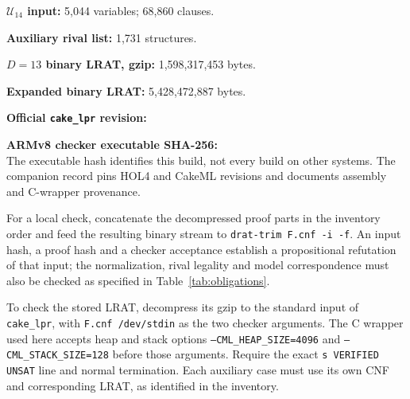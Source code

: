\documentclass[11pt,a4paper]{article}
\theoremstyle{definition}
\newcommand{\U}{\mathcal U_{14}}
\begin{document}
\medskip\noindent\textbf{$\U$ input:} 5,044 variables; 68,860 clauses.\\

\medskip\noindent\textbf{Auxiliary rival list:} 1,731 structures.\\

\medskip\noindent\textbf{$D=13$ binary LRAT, gzip:}
1,598,317,453 bytes.\\

\medskip\noindent\textbf{Expanded binary LRAT:} 5,428,472,887 bytes.\\

\medskip\noindent\textbf{Official \texttt{cake\_lpr} revision:}\\

\medskip\noindent\textbf{ARMv8 checker executable SHA-256:}\\
The executable hash identifies this build, not every build on other
systems. The companion record pins HOL4 and CakeML revisions and
documents assembly and C-wrapper provenance.
\endgroup

\medskip
For a local check, concatenate the decompressed proof parts in the
inventory order and feed the resulting binary stream to
\texttt{drat-trim F.cnf -i -f}. An input hash, a proof hash and a checker
acceptance establish a propositional refutation of that input; the
normalization, rival legality and model correspondence must also be
checked as specified in Table~\ref{tab:obligations}.

To check the stored LRAT, decompress its gzip to the standard input of
\texttt{cake\_lpr}, with \texttt{F.cnf /dev/stdin} as the two checker
arguments. The C wrapper used here accepts heap and stack options
\texttt{--CML\_HEAP\_SIZE=4096} and \texttt{--CML\_STACK\_SIZE=128} before
those arguments. Require the exact \texttt{s VERIFIED UNSAT} line and
normal termination. Each auxiliary case must use its own CNF and
corresponding LRAT, as identified in the inventory.
\end{document}
